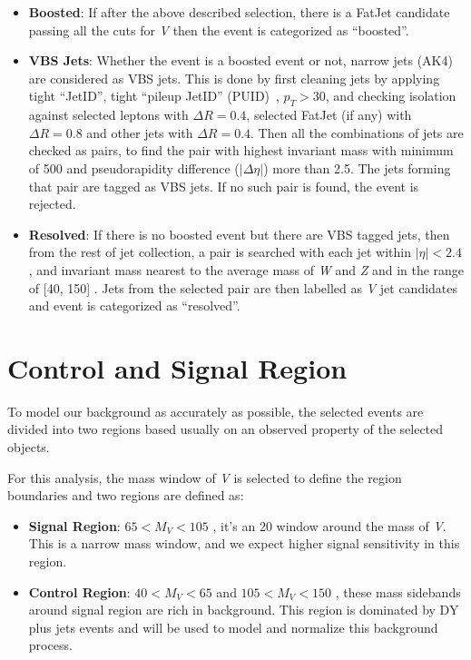 \begin{itemize}
  \item \textbf{Boosted}: If after the above described selection, there is
        a FatJet candidate passing all the cuts for \textit{V} then the event is
        categorized as ``boosted''.
  \item \textbf{VBS Jets}: Whether the event is a boosted event or not,
        narrow jets (AK4) are considered as VBS jets.
        This is done by first cleaning jets by applying tight ``JetID'',
        tight ``pileup JetID'' (PUID)~\cite{cms-jme-pu-run2},
        \( p_T > 30 \),
        and checking isolation against selected leptons with \(\Delta R = 0.4\),
        selected FatJet (if any) with \( \Delta R = 0.8 \)
        and other jets with \(\Delta R = 0.4\).
        Then all the combinations of jets are checked as pairs,
        to find the pair with highest invariant mass with minimum of 500 \GeV{}
        and pseudorapidity difference (\( |\Delta \eta| \)) more than 2.5.
        The jets forming that pair are tagged as VBS jets.
        If no such pair is found, the event is rejected.
  \item \textbf{Resolved}: If there is no boosted event but there
        are VBS tagged jets, then from the rest of jet collection, a pair
        is searched with each jet within
        \( |\eta| < 2.4 \), and invariant mass nearest to the average mass of \textit{W} and \textit{Z}
        and in the range of [40, 150] \GeV{}.
        Jets from the selected pair are then labelled as \textit{V} jet candidates
        and event is categorized as ``resolved''.
\end{itemize}

\section{
  Control and Signal Region
 }

To model our background as accurately as possible,
the selected events are divided into two regions based usually on
an observed property of the selected objects.

For this analysis, the mass window of \textit{V} is selected
to define the region boundaries and two regions are defined as:

\begin{itemize}
  \item \textbf{Signal Region}: \( 65 < M_{V} < 105 \) \GeV{},
        it's an 20 \GeV{} window around the mass of \textit{V}. This is a
        narrow mass window, and we expect higher signal sensitivity in this region.
  \item \textbf{Control Region}: \( 40 < M_{V} < 65 \) and \( 105 < M_{V} < 150 \) \GeV{},
        these mass sidebands around signal region are rich
        in background. This region is dominated by \gls{DY} plus jets
        events and will be used to model and normalize this background process.
\end{itemize}


